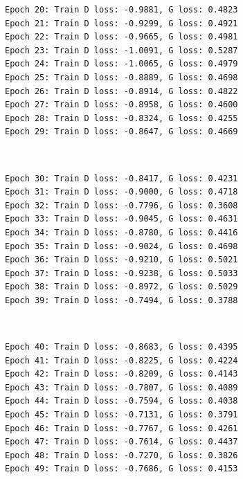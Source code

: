 \documentclass[11pt]{article}
\begin{document}
    \begin{Verbatim}[commandchars=\\\{\}]
Epoch 20: Train D loss: -0.9881, G loss: 0.4823
Epoch 21: Train D loss: -0.9299, G loss: 0.4921
Epoch 22: Train D loss: -0.9665, G loss: 0.4981
Epoch 23: Train D loss: -1.0091, G loss: 0.5287
Epoch 24: Train D loss: -1.0065, G loss: 0.4979
Epoch 25: Train D loss: -0.8889, G loss: 0.4698
Epoch 26: Train D loss: -0.8914, G loss: 0.4822
Epoch 27: Train D loss: -0.8958, G loss: 0.4600
Epoch 28: Train D loss: -0.8324, G loss: 0.4255
Epoch 29: Train D loss: -0.8647, G loss: 0.4669

    \end{Verbatim}

    \begin{center}
    \end{center}
    { \hspace*{\fill} \\}
    
    \begin{Verbatim}[commandchars=\\\{\}]
Epoch 30: Train D loss: -0.8417, G loss: 0.4231
Epoch 31: Train D loss: -0.9000, G loss: 0.4718
Epoch 32: Train D loss: -0.7796, G loss: 0.3608
Epoch 33: Train D loss: -0.9045, G loss: 0.4631
Epoch 34: Train D loss: -0.8780, G loss: 0.4416
Epoch 35: Train D loss: -0.9024, G loss: 0.4698
Epoch 36: Train D loss: -0.9210, G loss: 0.5021
Epoch 37: Train D loss: -0.9238, G loss: 0.5033
Epoch 38: Train D loss: -0.8972, G loss: 0.5029
Epoch 39: Train D loss: -0.7494, G loss: 0.3788

    \end{Verbatim}

    \begin{center}
    \end{center}
    { \hspace*{\fill} \\}
    
    \begin{Verbatim}[commandchars=\\\{\}]
Epoch 40: Train D loss: -0.8683, G loss: 0.4395
Epoch 41: Train D loss: -0.8225, G loss: 0.4224
Epoch 42: Train D loss: -0.8209, G loss: 0.4143
Epoch 43: Train D loss: -0.7807, G loss: 0.4089
Epoch 44: Train D loss: -0.7594, G loss: 0.4038
Epoch 45: Train D loss: -0.7131, G loss: 0.3791
Epoch 46: Train D loss: -0.7767, G loss: 0.4261
Epoch 47: Train D loss: -0.7614, G loss: 0.4437
Epoch 48: Train D loss: -0.7270, G loss: 0.3826
Epoch 49: Train D loss: -0.7686, G loss: 0.4153

    \end{Verbatim}
\end{document}
